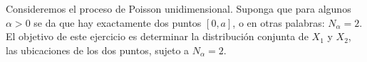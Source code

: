 \question
	Consideremos el proceso de Poisson unidimensional. Suponga que para algunos $\alpha>0$ se da que hay exactamente dos puntos $\left[0,a\right]$, o en otras palabras: $N_\alpha=2$. El objetivo de este ejercicio es determinar la distribución conjunta de $X_1$ y $X_2$, las ubicaciones de los dos puntos, sujeto a $N_\alpha=2$.


	\begin{solutionordottedlines}
		
	\end{solutionordottedlines}